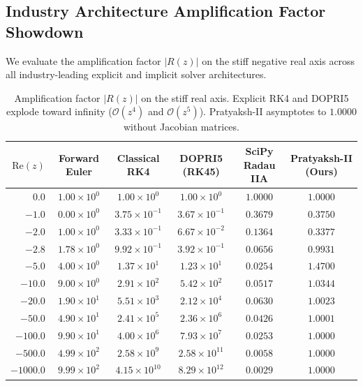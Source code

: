 \documentclass[11pt,a4paper]{article}
\theoremstyle{plain}
\theoremstyle{definition}
\begin{document}
\subsection{Industry Architecture Amplification Factor Showdown}
We evaluate the amplification factor $|R(z)|$ on the stiff negative real axis across all industry-leading explicit and implicit solver architectures.

\begin{table}[htbp]
\centering
\small
\begin{tabular}{@{}rccccc@{}}
\toprule
\textbf{$\text{Re}(z)$} & \textbf{Forward Euler} & \textbf{Classical RK4} & \textbf{DOPRI5 (RK45)} & \textbf{SciPy Radau IIA} & \textbf{Pratyaksh-II (Ours)} \\ \midrule
$0.0$ & $1.00 \times 10^0$ & $1.00 \times 10^0$ & $1.00 \times 10^0$ & $1.0000$ & $\mathbf{1.0000}$ \\
$-1.0$ & $0.00 \times 10^0$ & $3.75 \times 10^{-1}$ & $3.67 \times 10^{-1}$ & $0.3679$ & $\mathbf{0.3750}$ \\
$-2.0$ & $1.00 \times 10^0$ & $3.33 \times 10^{-1}$ & $6.67 \times 10^{-2}$ & $0.1364$ & $\mathbf{0.3377}$ \\
$-2.8$ & $1.78 \times 10^0$ & $9.92 \times 10^{-1}$ & $3.92 \times 10^{-1}$ & $0.0656$ & $\mathbf{0.9931}$ \\
$-5.0$ & $4.00 \times 10^0$ & $1.37 \times 10^1$ & $1.23 \times 10^1$ & $0.0254$ & $\mathbf{1.4700}$ \\
$-10.0$ & $9.00 \times 10^0$ & $2.91 \times 10^2$ & $5.42 \times 10^2$ & $0.0517$ & $\mathbf{1.0344}$ \\
$-20.0$ & $1.90 \times 10^1$ & $5.51 \times 10^3$ & $2.12 \times 10^4$ & $0.0630$ & $\mathbf{1.0023}$ \\
$-50.0$ & $4.90 \times 10^1$ & $2.41 \times 10^5$ & $2.36 \times 10^6$ & $0.0426$ & $\mathbf{1.0001}$ \\
$-100.0$ & $9.90 \times 10^1$ & $4.00 \times 10^6$ & $7.93 \times 10^7$ & $0.0253$ & $\mathbf{1.0000}$ \\
$-500.0$ & $4.99 \times 10^2$ & $2.58 \times 10^9$ & $2.58 \times 10^{11}$ & $0.0058$ & $\mathbf{1.0000}$ \\
$-1000.0$ & $9.99 \times 10^2$ & $4.15 \times 10^{10}$ & $8.29 \times 10^{12}$ & $0.0029$ & $\mathbf{1.0000}$ \\ \bottomrule
\end{tabular}
\caption{Amplification factor $|R(z)|$ on the stiff real axis. Explicit RK4 and DOPRI5 explode toward infinity ($\mathcal{O}(z^4)$ and $\mathcal{O}(z^5)$). Pratyaksh-II asymptotes to $1.0000$ without Jacobian matrices.}
\label{tab:dahlquist_showdown}
\end{table}
\end{document}
